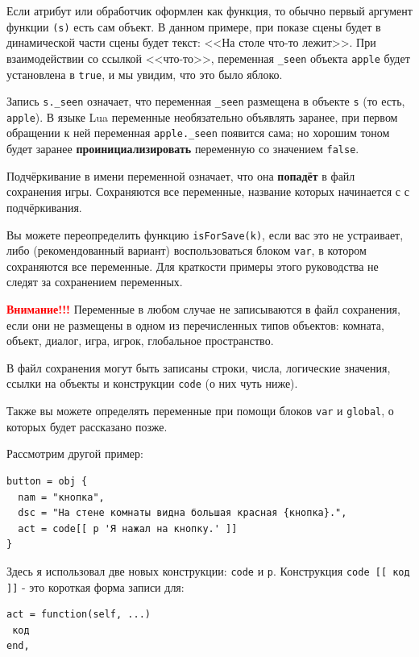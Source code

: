 \documentclass[a4paper,12pt]{article}
\begin{document}
Если атрибут или обработчик оформлен как функция, то обычно первый аргумент функции \verb/(s)/ есть сам объект. В данном примере, при показе сцены будет в динамической части сцены будет текст: <<На столе что-то лежит>>. При взаимодействии со ссылкой <<что-то>>, переменная \verb/_seen/ объекта \verb/apple/ будет установлена в \verb/true/, и мы увидим, что это было яблоко.

Запись \verb/s._seen/ означает, что переменная \verb/_seen/ размещена в объекте \verb/s/ (то есть, \verb/apple/). В языке Lua переменные необязательно объявлять заранее, при первом обращении к ней переменная \verb/apple._seen/ появится сама; но хорошим тоном будет заранее \textbf{проинициализировать} переменную со значением \verb/false/.

Подчёркивание в имени переменной означает, что она \textbf{попадёт} в файл сохранения игры. Сохраняются все переменные, название которых начинается с с подчёркивания.

Вы можете переопределить функцию \verb/isForSave(k)/, если вас это не устраивает, либо (рекомендованный вариант) воспользоваться блоком \verb/var/, в котором сохраняются все переменные. Для краткости примеры этого руководства не следят за сохранением переменных.

\textbf{\textcolor{red}{Внимание!!!}} Переменные в любом случае не записываются в файл сохранения, если они не размещены в одном из перечисленных типов объектов: комната, объект, диалог, игра, игрок, глобальное пространство.

В файл сохранения могут быть записаны строки, числа, логические значения, ссылки на объекты и конструкции \verb/code/ (о них чуть ниже).

Также вы можете определять переменные при помощи блоков \verb/var/ и \verb/global/, о которых будет рассказано позже.

Рассмотрим другой пример:

\begin{verbatim}
button = obj {
  nam = "кнопка",
  dsc = "На стене комнаты видна большая красная {кнопка}.",
  act = code[[ p 'Я нажал на кнопку.' ]]
}
\end{verbatim}

Здесь я использовал две новых конструкции: \verb/code/ и \verb/p/. Конструкция \verb/code [[ код ]]/ - это короткая форма записи для:

\begin{verbatim}
act = function(self, ...)
 код
end,
\end{verbatim}
\end{document}
